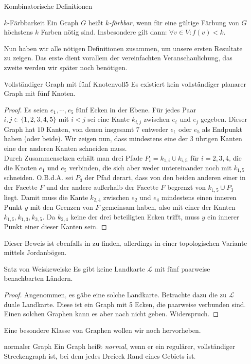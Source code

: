 \begin{section}{Kombinatorische Definitionen}
  \begin{definition}{$k$-Färbbarkeit}
   Ein Graph $G$ heißt \textit{$k$-färbbar}, wenn für eine gültige Färbung von $G$ höchstens $k$ Farben nötig sind. Insbesondere gilt dann: $\forall v \in V: f(v) < k$.
  \end{definition}
  
  Nun haben wir alle nötigen Definitionen zusammen, um unsere ersten Resultate zu zeigen. Das erste dient vorallem der vereinfachten Veranschaulichung, das zweite werden wir später noch benötigen.
  
  \begin{satzl}{Vollständiger Graph mit fünf Knoten}{voll5}
   Es existiert kein vollständiger planarer Graph mit fünf Knoten.
  \end{satzl}
  \begin{proof}
    Es seien $e_1,\cdots,e_5$ fünf Ecken in der Ebene. Für jedes Paar $i,j \in \{1,2,3,4,5\}$ mit $i < j$ sei eine Kante $k_{i,j}$ zwischen $e_i$ und $e_j$ gegeben. Dieser Graph hat $10$ Kanten, von denen insgesamt $7$ entweder $e_1$ oder $e_5$ als Endpunkt haben (oder beide). Wir zeigen nun, dass mindestens eine der $3$ übrigen Kanten eine der anderen Kanten schneiden muss.\\
    Durch Zusammensetzen erhält man drei Pfade $P_i = k_{1,i} \cup k_{i,5}$ für $i = 2,3,4$, die die Knoten $e_1$ und $e_5$ verbinden, die sich aber weder untereinander noch mit $k_{1,5}$ schneiden. O.B.d.A. sei $P_3$ der Pfad derart, dass von den beiden anderen einer in der Facette $F$ und der andere außerhalb der Facette $F$ begrenzt von $k_{1,5} \cup P_3$ liegt. Damit muss die Kante $k_{2,4}$ zwischen $e_2$ und $e_4$ mindestens einen inneren Punkt $y$ mit den Grenzen von $F$ gemeinsam haben, also mit einer der Kanten $k_{1,5},k_{1,3},k_{3,5}$. Da $k_{2,4}$ keine der drei beteiligten Ecken trifft, muss $y$ ein innerer Punkt einer dieser Kanten sein.
  \end{proof}
  
  Dieser Beweis ist ebenfalls in \cite[Satz 4.1.2]{fritsch} zu finden, allerdings in einer topologischen Variante mittels Jordanbögen. 
  
 \begin{satzl}{Satz von Weiske}{weiske}
  Es gibt keine Landkarte $\mathcal{L}$ mit fünf paarweise benachbarten Ländern.
 \end{satzl}
 \begin{proof}
  Angenommen, es gäbe eine solche Landkarte. Betrachte dazu die zu $\mathcal{L}$ duale Landkarte. Diese ist ein Graph mit 5 Ecken, die paarweise verbunden sind. Einen solchen Graphen kann es aber nach  nicht geben. Widerspruch.
 \end{proof}

  
  Eine besondere Klasse von Graphen wollen wir noch hervorheben.
  
  \begin{definition}{normaler Graph}
   Ein Graph heißt \textit{normal}, wenn er ein regulärer, vollständiger Streckengraph ist, bei dem jedes Dreieck Rand eines Gebiets ist.
  \end{definition}
\end{section}